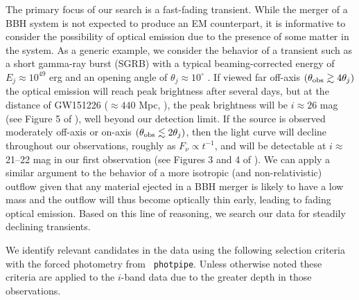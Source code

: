 The primary focus of our search is a fast-fading transient.
While the merger of a BBH system is not expected
to produce an EM counterpart, it is informative to consider the
possibility of optical emission due to the presence of some matter in
the system. As a generic example, we consider the behavior of a
transient such as a short gamma-ray burst (SGRB) with a typical beaming-corrected energy of
$E_j \approx 10^{49}$ erg and an opening angle of $\theta_j\approx
10^\circ$ \citep{Berger2014,Fong+15}. If viewed far off-axis $(\theta_{\rm
  obs}\gtrsim 4\theta_j)$ the optical emission will reach peak
brightness after several days, but at the distance of GW151226
($\approx440$ Mpc, \citealt{LIGOGW151226}), the peak brightness will be $i\approx 26$ mag (see Figure 5 of
\citealt{MetzgerBerger12}), well beyond our detection limit. If the source
is observed moderately off-axis or on-axis $(\theta_{\rm obs} \lesssim
2\theta_j)$, then the light curve will decline throughout our
observations, roughly as $F_\nu\propto t^{-1}$, and will be detectable
at $i\approx$ 21--22 mag in our first observation (see Figures 3 and 4
of \citealt{MetzgerBerger12}). We can apply a similar argument to the
behavior of a more isotropic (and non-relativistic) outflow given that
any material ejected in a BBH merger is likely to have a low mass and
the outflow will thus become optically thin early, leading to fading
optical emission. Based on this line of reasoning, we search our data
for steadily declining transients.

We identify relevant candidates in the data using the following
selection criteria with the forced photometry from {\tt
  photpipe}. Unless otherwise noted these criteria are applied to
  the $i$-band data due to the greater depth in those observations.

